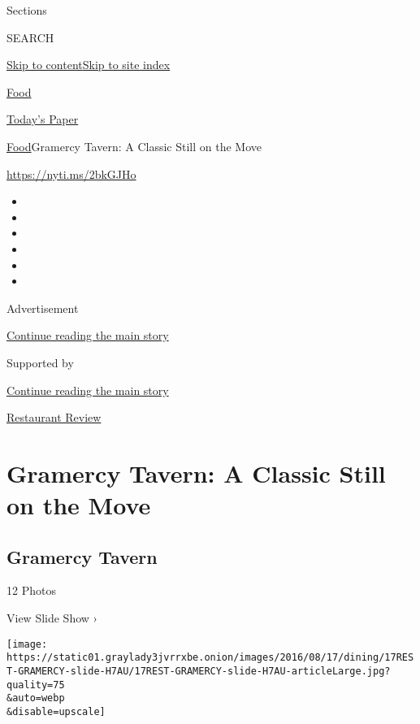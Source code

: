 Sections

SEARCH

\protect\hyperlink{site-content}{Skip to
content}\protect\hyperlink{site-index}{Skip to site index}

\href{https://www.nytimes3xbfgragh.onion/section/food}{Food}

\href{https://myaccount.nytimes3xbfgragh.onion/auth/login?response_type=cookie\&client_id=vi}{}

\href{https://www.nytimes3xbfgragh.onion/section/todayspaper}{Today's
Paper}

\href{/section/food}{Food}\textbar{}Gramercy Tavern: A Classic Still on
the Move

\url{https://nyti.ms/2bkGJHo}

\begin{itemize}
\item
\item
\item
\item
\item
\item
\end{itemize}

Advertisement

\protect\hyperlink{after-top}{Continue reading the main story}

Supported by

\protect\hyperlink{after-sponsor}{Continue reading the main story}

\href{/column/restaurant-review}{Restaurant Review}

\hypertarget{gramercy-tavern-a-classic-still-on-the-move}{%
\section{Gramercy Tavern: A Classic Still on the
Move}\label{gramercy-tavern-a-classic-still-on-the-move}}

\href{https://www.nytimes3xbfgragh.onion/slideshow/2016/08/17/dining/gramercy-tavern-nyc.html}{}

\hypertarget{gramercy-tavern}{%
\subsection{Gramercy Tavern}\label{gramercy-tavern}}

12 Photos

View Slide Show ›

\texttt{[image: https://static01.graylady3jvrrxbe.onion/images/2016/08/17/dining/17REST-GRAMERCY-slide-H7AU/17REST-GRAMERCY-slide-H7AU-articleLarge.jpg?quality=75\\\&auto=webp\\\&disable=upscale]}

